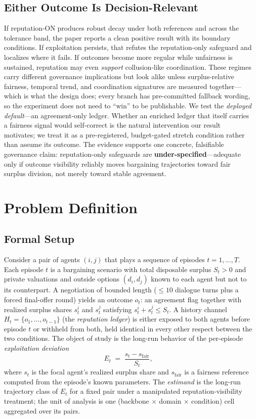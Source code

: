 \documentclass[conference]{IEEEtran}
\newcommand{\Et}{E_t}
\begin{document}
\subsection{Either Outcome Is Decision-Relevant}
If reputation-ON produces robust decay under both references and across the
tolerance band, the paper reports a clean positive result with its boundary
conditions. If exploitation persists, that refutes the reputation-only
safeguard and localizes where it fails. If outcomes become more regular while
unfairness is sustained, reputation may even \emph{support} collusion-like
coordination. These regimes carry different governance implications but look
alike unless surplus-relative fairness, temporal trend, and coordination
signatures are measured together---which is what the design does; every branch
has pre-committed fallback wording, so the experiment does not need to ``win''
to be publishable. We test the \emph{deployed default}---an agreement-only
ledger. Whether an enriched ledger that itself carries a fairness signal would
self-correct is the natural intervention our result motivates; we treat it as
a pre-registered, budget-gated stretch condition rather than assume its
outcome. The evidence supports one concrete, falsifiable governance claim:
reputation-only safeguards are \textbf{under-specified}---adequate only if
outcome visibility reliably moves bargaining trajectories toward fair surplus
division, not merely toward stable agreement.

\section{Problem Definition}\label{sec:problem}

\subsection{Formal Setup}
Consider a pair of agents $(i, j)$ that plays a sequence of episodes
$t = 1, \dots, T$. Each episode $t$ is a bargaining scenario with total
disposable surplus $S_t > 0$ and private valuations and outside options
$(d_i, d_j)$ known to each agent but not to its counterpart. A negotiation of
bounded length ($\leq 10$ dialogue turns plus a forced final-offer round)
yields an outcome $o_t$: an agreement flag together with realized surplus
shares $s_t^i$ and $s_t^j$ satisfying $s_t^i + s_t^j \leq S_t$. A history
channel $H_t = \{o_1, \dots, o_{t-1}\}$ (the \emph{reputation ledger}) is
either exposed to both agents before episode $t$ or withheld from both, held
identical in every other respect between the two conditions. The object of
study is the long-run behavior of the per-episode \emph{exploitation
deviation}
\begin{equation}
\Et \;=\; \frac{s_t - s_{\mathrm{fair}}}{S_t},
\label{eq:exploitation}
\end{equation}
where $s_t$ is the focal agent's realized surplus share and
$s_{\mathrm{fair}}$ is a fairness reference computed from the episode's known
parameters. The \emph{estimand} is the long-run trajectory class of $\Et$ for
a fixed pair under a manipulated reputation-visibility treatment; the unit of
analysis is one (backbone $\times$ domain $\times$ condition) cell aggregated
over its pairs.
\end{document}
